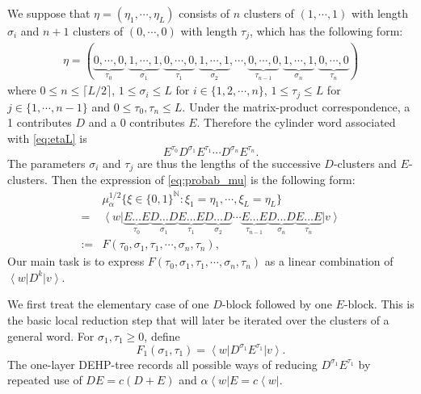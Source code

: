 \documentclass[12pt,a4paper]{amsart}
\newcommand{\bra}[1]{\left\langle #1\right|}
\newcommand{\ket}[1]{\left|#1\right\rangle}
\theoremstyle{remark}
\numberwithin{equation}{section} \numberwithin{theorem}{section}
\begin{document}
We suppose that $\eta=(\eta_1, \cdots, \eta_{L})$ consists of $n$ clusters of $(1,\cdots,1)$ with length $\sigma_i$ and $n+1$ clusters of $(0,\cdots,0)$ with length $\tau_j$, which has the following form:
\begin{align}
\label{eq:etaL}
\eta=(\underbrace{0,\cdots,0}_{\tau_0}, \underbrace{1,\cdots,1}_{\sigma_1}, \underbrace{0,\cdots,0}_{\tau_1}, \underbrace{1,\cdots,1}_{\sigma_2}, \cdots,  \underbrace{0,\cdots,0}_{\tau_{n-1}}, \underbrace{1,\cdots,1}_{\sigma_n}, \underbrace{0,\cdots,0}_{\tau_n})
\end{align}
where $0 \leq n \leq \lceil L/2 \rceil$,  $1 \leq \sigma_i \leq L$ for $i \in \{1, 2, \cdots, n\}$, $1 \leq \tau_j \leq L$ for $j \in \{1, \cdots, n-1\}$ and $0 \leq \tau_0, \tau_n \leq L$. 
Under the matrix-product correspondence, a 1 contributes $D$ and a 0 contributes $E$. 
Therefore the cylinder word associated with \eqref{eq:etaL} is
\[
E^{\tau_0}D^{\sigma_1}E^{\tau_1}\cdots D^{\sigma_n}E^{\tau_n}.
\]
The parameters $\sigma_i$ and $\tau_j$ are thus the lengths of the successive $D$-clusters and $E$-clusters. 
Then the expression of \eqref{eq:probab_mu} is the following form:
\begin{align*}
&\mu_{\alpha}^{1/2}\{\xi \in \{0,1\}^{\mathbb{N}}: \xi_1=\eta_1, \cdots, \xi_L=\eta_L\}\\
=&\bra{w}\underbrace{E\ldots E}_{\tau_0} \underbrace{D \ldots D}_{\sigma_1} \underbrace{E \ldots E}_{\tau_1}  \underbrace{D \ldots D}_{\sigma_2}  \cdots \underbrace{E \ldots E}_{\tau_{n-1}}  \underbrace{D \ldots D}_{\sigma_n}  \underbrace{E \ldots E}_{\tau_n}\ket{v}\\
:=& F(\tau_0,\sigma_1, \tau_1, \cdots, \sigma_n, \tau_n),
\end{align*}
Our main task is to express $F(\tau_0, \sigma_1, \tau_1, \cdots, \sigma_n, \tau_n)$ as a linear combination of $\bra{w}D^{k}\ket{v}$.

We first treat the elementary case of one $D$-block followed by one $E$-block. 
This is the basic local reduction step that will later be iterated over the clusters of a general word. 
For $\sigma_1,\tau_1\geq0$, define
\[
F_1(\sigma_1,\tau_1)
=
\bra{w}D^{\sigma_1}E^{\tau_1}\ket{v}.
\]
The one-layer DEHP-tree records all possible ways of reducing $D^{\sigma_1}E^{\tau_1}$ by repeated use of $DE=c(D+E)$ and $\alpha\bra{w}E=c\bra{w}$.
\end{document}
